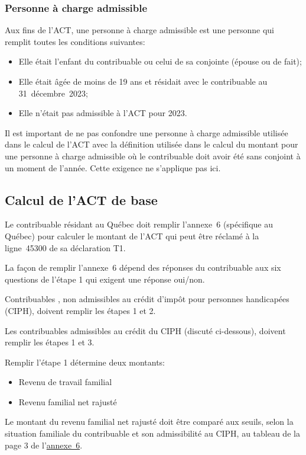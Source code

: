 \subsubsection{Personne à charge admissible}
Aux fins de l'ACT, une personne à charge admissible est une personne qui remplit toutes les conditions suivantes:
\begin{itemize}[label=]
	\item Elle était l'enfant du contribuable ou celui de sa conjointe (épouse ou de fait);
	\item Elle était âgée de moins de 19 ans et résidait avec le contribuable au 31~décembre~2023;
	\item Elle n'était pas admissible à l'ACT pour 2023.
\end{itemize}
\begin{note}
	Il est important de ne pas confondre une \og personne à charge admissible \fg{} utilisée dans le calcul de l'ACT avec la définition utilisée dans le calcul du \og montant pour une personne à charge admissible\fg{} où le contribuable doit avoir été sans conjoint à un moment de l'année. Cette exigence ne s'applique pas ici.
\end{note}


\subsection{Calcul de l'ACT de base}
Le contribuable résidant au Québec doit remplir l'annexe~6 (spécifique au Québec) pour calculer le montant de l'ACT qui peut être réclamé à la ligne~45300 de sa déclaration T1.

La façon de remplir l'annexe~6 dépend des réponses du contribuable aux six questions de l'étape 1 qui exigent une réponse oui/non.

Contribuables , non admissibles au crédit d'impôt pour personnes handicapées (CIPH), doivent remplir les étapes 1 et 2.

Les contribuables admissibles au crédit du CIPH (discuté ci-dessous), doivent remplir les étapes 1 et 3.

Remplir l'étape 1 détermine deux montants:
\begin{itemize}
	\item Revenu de travail familial
	\item Revenu familial net rajusté
\end{itemize}

Le montant du revenu familial net rajusté doit être comparé aux seuils, selon la situation familiale du contribuable et son admissibilité au CIPH, au tableau de la page 3 de l'\href{https://www.canada.ca/fr/agence-revenu/services/formulaires-publications/trousses-impot-toutes-annees-imposition/trousse-generale-impot-prestations/quebec/5005-s6.html}{annexe~6}.

